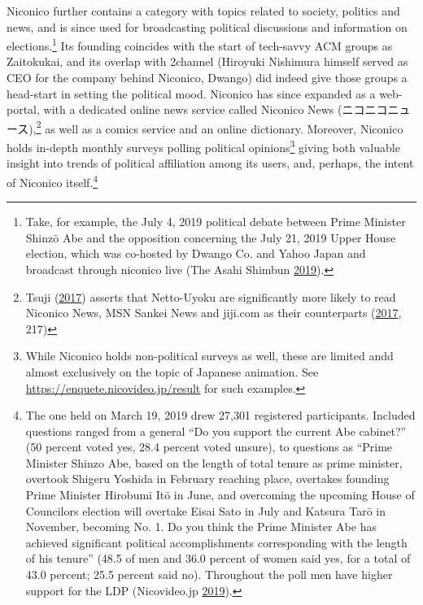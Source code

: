\documentclass[10pt,british,A4paper,,openany]{memoir}
\begin{document}
Niconico further contains a category with topics related to society,
politics and news, and is since used for broadcasting political
discussions and information on elections.\footnote{Take, for example,
  the July 4, 2019 political debate between Prime Minister Shinzō Abe
  and the opposition concerning the July 21, 2019 Upper House election,
  which was co-hosted by Dwango Co. and Yahoo Japan and broadcast
  through niconico live (The Asahi Shimbun
  \protect\hyperlink{ref-the_asahi_shimbun_constitutional_2019}{2019}).}
Its founding coincides with the start of tech-savvy ACM groups as
Zaitokukai, and its overlap with 2channel (Hiroyuki Nishimura himself
served as CEO for the company behind Niconico, Dwango) did indeed give
those groups a head-start in setting the political mood. Niconico has
since expanded as a web-portal, with a dedicated online news service
called Niconico News (ニコニコニュース),\footnote{Tsuji
  (\protect\hyperlink{ref-tsuji_eng._2017}{2017}) asserts that
  Netto-Uyoku are significantly more likely to read Niconico News, MSN
  Sankei News and jiji.com as their counterparts
  (\protect\hyperlink{ref-tsuji_eng._2017}{2017}, 217)} as well as a
comics service and an online dictionary. Moreover, Niconico holds
in-depth monthly surveys polling political opinions\footnote{While
  Niconico holds non-political surveys as well, these are limited andd
  almost exclusively on the topic of Japanese animation. See
  \url{https://enquete.nicovideo.jp/result} for such examples.} giving
both valuable insight into trends of political affiliation among its
users, and, perhaps, the intent of Niconico itself.\footnote{The one
  held on March 19, 2019 drew 27,301 registered participants. Included
  questions ranged from a general ``Do you support the current Abe
  cabinet?'' (50 percent voted yes, 28.4 percent voted unsure), to
  questions as ``Prime Minister Shinzo Abe, based on the length of total
  tenure as prime minister, overtook Shigeru Yoshida in February
  reaching  place, overtakes founding Prime Minister Hirobumi Itō
  in June, and overcoming the upcoming House of Councilors election will
  overtake Eisai Sato in July and Katsura Tarō in November, becoming No.
  1. Do you think the Prime Minister Abe has achieved significant
  political accomplishments corresponding with the length of his
  tenure'' (48.5 of men and 36.0 percent of women said yes, for a total
  of 43.0 percent; 25.5 percent said no). Throughout the poll men have
  higher support for the LDP (Nicovideo.jp
  \protect\hyperlink{ref-nicovideo.jp_monthly_2019}{2019}).}
\end{document}
